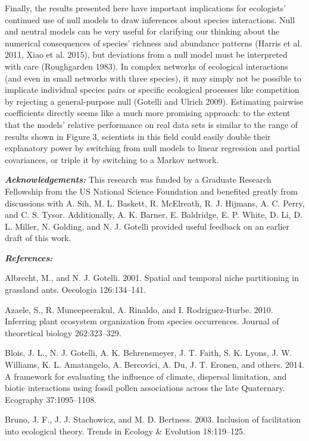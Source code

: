 \documentclass[12pt,]{article}
\begin{document}
\begin{spacing}{1.9}
\begin{flushleft}
Finally, the results presented here have important implications for
ecologists' continued use of null models to draw inferences about
species interactions. Null and neutral models can be very useful for
clarifying our thinking about the numerical consequences of species'
richness and abundance patterns (Harris et al. 2011, Xiao et al. 2015),
but deviations from a null model must be interpreted with care
(Roughgarden 1983). In complex networks of ecological interactions (and
even in small networks with three species), it may simply not be
possible to implicate individual species pairs or specific ecological
processes like competition by rejecting a general-purpose null (Gotelli
and Ulrich 2009). Estimating pairwise coefficients directly seems like a
much more promising approach: to the extent that the models' relative
performance on real data sets is similar to the range of results shown
in Figure 3, scientists in this field could easily double their
explanatory power by switching from null models to linear regression and
partial covariances, or triple it by switching to a Markov network.

\textbf{\emph{Acknowledgements:}} This research was funded by a Graduate
Research Fellowship from the US National Science Foundation and
benefited greatly from discussions with A. Sih, M. L. Baskett, R.
McElreath, R. J. Hijmans, A. C. Perry, and C. S. Tysor. Additionally, A.
K. Barner, E. Baldridge, E. P. White, D. Li, D. L. Miller, N. Golding,
and N. J. Gotelli provided useful feedback on an earlier draft of this
work.

\textbf{\emph{References:}}


Albrecht, M., and N. J. Gotelli. 2001. Spatial and temporal niche
partitioning in grassland ants. Oecologia 126:134--141.

Azaele, S., R. Muneepeerakul, A. Rinaldo, and I. Rodriguez-Iturbe. 2010.
Inferring plant ecosystem organization from species occurrences. Journal
of theoretical biology 262:323--329.

Blois, J. L., N. J. Gotelli, A. K. Behrensmeyer, J. T. Faith, S. K.
Lyons, J. W. Williams, K. L. Amatangelo, A. Bercovici, A. Du, J. T.
Eronen, and others. 2014. A framework for evaluating the influence of
climate, dispersal limitation, and biotic interactions using fossil
pollen associations across the late Quaternary. Ecography 37:1095--1108.

Bruno, J. F., J. J. Stachowicz, and M. D. Bertness. 2003. Inclusion of
facilitation into ecological theory. Trends in Ecology \& Evolution
18:119--125.


\end{flushleft}
\end{spacing}
\end{document}
